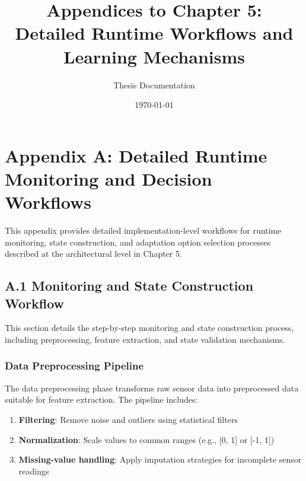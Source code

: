 \documentclass[11pt,a4paper]{article}
\title{Appendices to Chapter 5:\\Detailed Runtime Workflows and Learning Mechanisms}
\author{Thesis Documentation}
\date{\today}
\begin{document}
\maketitle

\tableofcontents
\newpage


\section{Appendix A: Detailed Runtime Monitoring and Decision Workflows}
\label{app:runtime-workflows}

This appendix provides detailed implementation-level workflows for runtime monitoring, state construction, and adaptation option selection processes described at the architectural level in Chapter 5.


\subsection{A.1 Monitoring and State Construction Workflow}
\label{app:monitoring-workflow}

This section details the step-by-step monitoring and state construction process, including preprocessing, feature extraction, and state validation mechanisms.

\subsubsection{Data Preprocessing Pipeline}

The data preprocessing phase transforms raw sensor data into preprocessed data suitable for feature extraction. The pipeline includes:

\begin{enumerate}
    \item \textbf{Filtering}: Remove noise and outliers using statistical filters
    \item \textbf{Normalization}: Scale values to common ranges (e.g., [0, 1] or [-1, 1])
    \item \textbf{Missing-value handling}: Apply imputation strategies for incomplete sensor readings
\end{enumerate}
\end{document}
